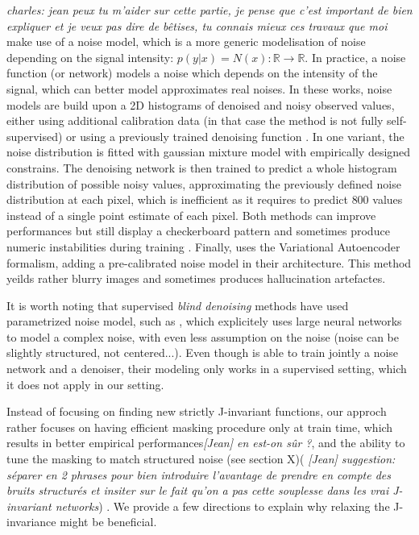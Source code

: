 \documentclass{article}
\begin{document}
\textit{charles: jean peux tu m'aider sur cette partie, je pense que c'est important de bien expliquer et je veux pas dire de bêtises, tu connais mieux ces travaux que moi}
\cite{krull2019probabilistic,prakash2020fully,2020DivNoising} make use of a noise model, which is a more generic modelisation of noise depending on the signal intensity: $p(y|x) = N(x): \mathbb{R} \to \mathbb{R}$. In practice, a noise function (or network)  models a noise which depends on the intensity of the signal, which can better model approximates real noises.
In these works, noise models are build upon a 2D histograms of denoised and noisy observed values, either using additional calibration data \cite{krull2019probabilistic} (in that case the method is not fully self-supervised) or using a previously trained denoising function \cite{krull2019probabilistic}. In one variant, the noise distribution is fitted with gaussian mixture model with empirically designed constrains.
The denoising network is then trained to predict a whole histogram distribution of possible noisy values, approximating the previously defined noise distribution at each pixel, which is inefficient as it requires to predict $800$ values instead of a single point estimate of each pixel.
Both methods can improve performances but still display a checkerboard pattern and sometimes produce numeric instabilities during training \cite{goncharova2020}.
Finally, \cite{2020DivNoising} uses the Variational Autoencoder formalism, adding a pre-calibrated noise model in their architecture. This method yeilds rather blurry images and sometimes produces hallucination artefactes.

It is worth noting that supervised \textit{blind denoising} methods have used parametrized noise model, such as \cite{zhang2017beyond,yue2019variational}, which explicitely uses large neural networks to model a complex noise, with even less assumption on the noise (noise can be slightly structured, not centered...). Even though \cite{yue2019variational} is able to train jointly a noise network and a denoiser, their modeling only works in a supervised setting, which it does not apply in our setting.

Instead of focusing on finding new strictly J-invariant functions, our approch rather focuses on having efficient masking procedure only at train time, which results in better empirical performances\textit{[Jean] en est-on sûr ?}, and the ability to tune the masking to match structured noise (see section X)(\cite{broaddus2020removing} \textit{[Jean] suggestion: séparer en 2 phrases pour bien introduire l'avantage de prendre en compte des bruits structurés et insiter sur le fait qu'on a pas cette souplesse dans les vrai J-invariant networks}) . We provide a few directions to explain why relaxing the J-invariance might be beneficial.
\end{document}

